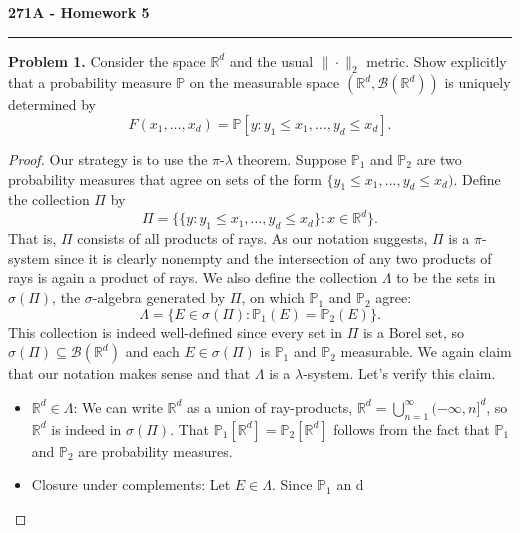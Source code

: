 \documentclass[11pt,letterpaper]{report}
\newcommand{\reals}{\mathbb{R}}
\newcommand{\mcal}[1]{\mathcal{#1}}
\newcommand{\Prob}{\mathbb{P}}
\begin{document}
\begin{center}
{\bf \Large 271A - Homework 5}
\vspace{0.2cm}
\hrule
\end{center}

\noindent\textbf{Problem 1. }
Consider the space $\reals^d$ and the usual $\|\cdot \|_2$ metric. Show explicitly that a probability measure $\Prob$ on the measurable space $(\reals^d, \mcal{B}(\reals^d))$ is uniquely determined by
\[
F(x_1, \ldots, x_d) = \Prob[y: y_1\leq x_1, \ldots, y_d\leq x_d].
\]
\begin{proof}
	Our strategy is to use the $\pi$-$\lambda$ theorem. Suppose $\Prob_1$ and $\Prob_2$ are two probability measures that agree on sets of the form $\{y_1 \leq x_1, \ldots, y_d\leq x_d)$. Define the collection $\Pi$ by
	\[
	\Pi = \big\{ \{y: y_1\leq x_1, \ldots, y_d\leq x_d\}: x\in \reals^d\big\}.
	\]
	That is, $\Pi$ consists of all products of rays. As our notation suggests, $\Pi$ is a $\pi$-system since it is clearly nonempty and the intersection of any two products of rays is again a product of rays. We also define the collection $\Lambda$ to be the sets in $\sigma(\Pi)$, the $\sigma$-algebra generated by $\Pi$, on which $\Prob_1$ and $\Prob_2$ agree:
	\[
	\Lambda = \{E \in \sigma(\Pi): \Prob_1(E) = \Prob_2(E)\}.
	\]
	This collection is indeed well-defined since every set in $\Pi$ is a Borel set, so $\sigma(\Pi)\subseteq \mcal{B}(\reals^d)$ and each $E\in \sigma(\Pi)$ is $\Prob_1$ and $\Prob_2$ measurable. We again claim that our notation makes sense and that $\Lambda$ is a $\lambda$-system. Let's verify this claim.
	\begin{itemize}
		\item $\reals^d\in \Lambda$: We can write $\reals^d$ as a union of ray-products, $\reals^d = \bigcup_{n=1}^\infty (-\infty, n]^d$, so $\reals^d$ is indeed in $\sigma(\Pi)$. That $\Prob_1[\reals^d] = \Prob_2[\reals^d]$ follows from the fact that $\Prob_1$ and $\Prob_2$ are probability measures.

		\item Closure under complements: Let $E\in \Lambda$. Since $\Prob_1$ an d
	\end{itemize}
\end{proof}
\end{document}
